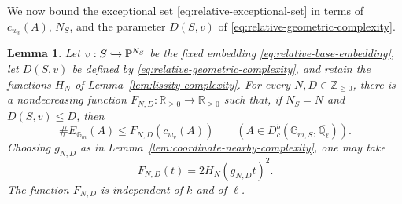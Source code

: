 \documentclass[12pt,reqno]{amsart}
\theoremstyle{definition}
\theoremstyle{plain}
\newtheorem{lem}[para]{Lemma}
\theoremstyle{definition}
\theoremstyle{remark}
\newcommand{\bbG}{\mathbb{G}}  \newcommand{\bbH}{\mathbb{H}}
\newcommand{\bbQ}{\mathbb{Q}}  \newcommand{\bbR}{\mathbb{R}}
\newcommand{\ol}[1]{\overline{#1}}
\newcommand{\Ql}{\bbQ_{\ell}}
\newcommand{\Db}{D^b_c}
\newcommand{\Gm}{\bbG_m}
\begin{document}
We now bound the exceptional set \eqref{eq:relative-exceptional-set} in terms of \(c_{w_v}(A)\),
\(N_S\), and the parameter \(D(S,v)\) of \eqref{eq:relative-geometric-complexity}.

\begin{lem}
\label{lem:exceptional}
Let \(v:S\hookrightarrow\mathbb{P}^{N_S}\) be the fixed embedding
\eqref{eq:relative-base-embedding}, let \(D(S,v)\) be defined by
\eqref{eq:relative-geometric-complexity}, and retain the functions \(H_N\) of
Lemma~\ref{lem:lissity-complexity}.
For every \(N,D\in\mathbb Z_{\ge0}\), there is a nondecreasing function
\(F_{N,D}:\mathbb R_{\ge0}\to\mathbb R_{\ge0}\) such that, if \(N_S=N\) and \(D(S,v)\le D\), then
\[
        \#E_{\Gm}(A)\le F_{N,D}(c_{w_v}(A))
        \qquad(A\in\Db(\bbG_{m,S},\ol\Ql)).
\]
Choosing \(g_{N,D}\) as in Lemma~\ref{lem:coordinate-nearby-complexity}, one may take
\[
        F_{N,D}(t)=2H_N(g_{N,D}t)^2.
\]
The function \(F_{N,D}\) is independent of \(\bar k\) and of \(\ell\).
\end{lem}
\end{document}
